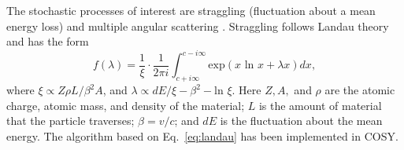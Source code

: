 \documentclass[portrait,a0paper,fontscale=0.285]{baposter} %
\begin{document}
\begin{poster}


{
The stochastic processes of interest are straggling (fluctuation about a mean energy loss) and multiple angular scattering \cite{icap15}.
Straggling follows Landau theory and has the form \cite{landau}
\begin{equation}
f(\lambda) = \frac{1}{\xi} \cdot \frac{1}{2\pi i} \int_{c+i \infty} ^{c-i \infty} \text{exp}(x\text{ ln } x + \lambda x) dx,
\label{eq:landau}
\end{equation}
where $\xi \propto Z\rho L/\beta^2 A$, and $\lambda \propto dE/\xi - \beta^2 - \text{ln } \xi$. Here $Z, A,$ and $\rho$ are the atomic charge, atomic mass, and density of the material; $L$ is the amount of material that the particle traverses; $\beta=v/c$; and $dE$ is the fluctuation about the mean energy. The algorithm based on Eq.~\eqref{eq:landau} has been implemented in COSY.

}
\end{poster}
\end{document}
